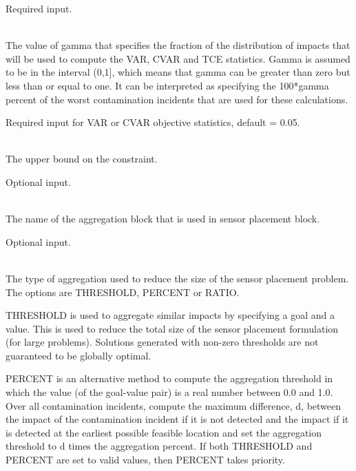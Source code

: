 \begin{description}[topsep=0pt,parsep=0.5em,itemsep=-0.4em]
\begin{description}[topsep=0pt,parsep=0.5em,itemsep=-0.4em]
                Required input.
    \item[{gamma}]\hfill
\\The value of gamma that specifies the fraction of the distribution of impacts that
                will be used to compute the VAR, CVAR and TCE statistics. Gamma
                is assumed to be in the interval (0,1], which means that gamma 
				can be greater than zero but less than or equal to one. It can be interpreted
                as specifying the 100*gamma percent of the worst contamination
                incidents that are used for these calculations.  
                
                Required input for VAR or CVAR objective statistics, default = 0.05.
    \item[{bound}]\hfill
\\The upper bound on the constraint.
                
                Optional input.
  \end{description}
  \item[{aggregate}]\hfill
  \begin{description}[topsep=0pt,parsep=0.5em,itemsep=-0.4em]
    \item[{name}]\hfill
\\The name of the aggregation block that is used in sensor placement block.
                
                Optional input.
    \item[{type}]\hfill
\\The type of aggregation used to reduce the size of the sensor placement problem.  
                The options are THRESHOLD, PERCENT or RATIO.

                THRESHOLD is used to aggregate similar impacts by specifying a goal and a value.  
                This is used to reduce the total size of the sensor placement formulation (for large problems).
                Solutions generated with non-zero thresholds are not guaranteed
                to be globally optimal.

                PERCENT is an alternative method to compute the aggregation threshold 
                in which the value (of the goal-value pair) is a real number between 0.0 and 1.0. 
                Over all contamination incidents, compute the maximum difference, d, between the impact of the
                contamination incident if it is not detected and the impact if it is detected
                at the earliest possible feasible location and set the aggregation threshold to 
                d times the aggregation percent. If both THRESHOLD and PERCENT are set to valid values, 
                then PERCENT takes priority.


\end{description}
\end{description}
